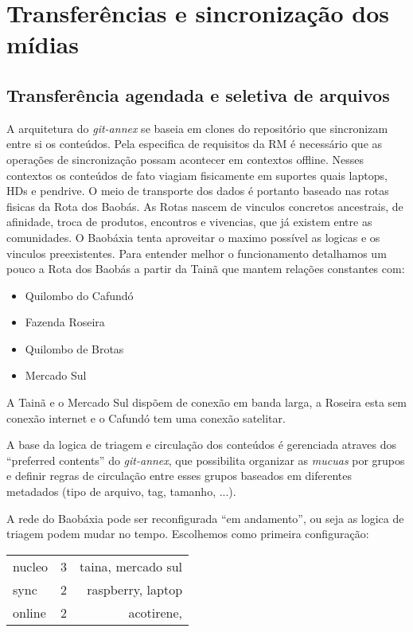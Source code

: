 \chapter{Transferências e sincronização dos mídias}\label{Transferências e sincronização dos mídias}\lhead{\leftmark}

\section{Transferência agendada e seletiva de arquivos}
A arquitetura do \emph{git-annex} se baseia em clones do repositório
que sincronizam entre si os conteúdos. Pela especifica de requisitos
da RM é necessário que as operações de sincronização possam acontecer
em contextos offline. Nesses contextos os conteúdos de fato viagiam
fisicamente em suportes quais laptops, HDs e pendrive. O meio de
transporte dos dados é portanto baseado nas rotas fisicas da Rota dos
Baobás. As Rotas nascem de vinculos concretos ancestrais, de
afinidade, troca de produtos, encontros e vivencias, que já existem
entre as comunidades. O Baobáxia tenta aproveitar o maximo possível as
logicas e os vinculos preexistentes. Para entender melhor o
funcionamento detalhamos um pouco a Rota dos Baobás a partir da Tainã
que mantem relações constantes com:
\begin{itemize}
  \item Quilombo do Cafundó
  \item Fazenda Roseira
  \item Quilombo de Brotas
  \item Mercado Sul
\end{itemize}

A Tainã e o Mercado Sul dispõem de conexão em banda larga, a Roseira
esta sem conexão internet e o Cafundó tem uma conexão satelitar.

A base da logica de triagem e circulação dos conteúdos é gerenciada
atraves dos ``preferred contents'' do \emph{git-annex}, que
possibilita organizar as \emph{mucuas} por grupos e definir regras de
circulação entre esses grupos baseados em diferentes metadados (tipo
de arquivo, tag, tamanho, ...).

A rede do Baobáxia pode ser reconfigurada ``em andamento'', ou seja as
logica de triagem podem mudar no tempo. Escolhemos como primeira
configuração:

\begin{tabular}{ l | c || r }
  \hline                       
  nucleo & 3 & taina, mercado sul \\
  sync & 2 & raspberry, laptop \\
  online & 2 & acotirene,  \\
  \hline  
\end{tabular}




